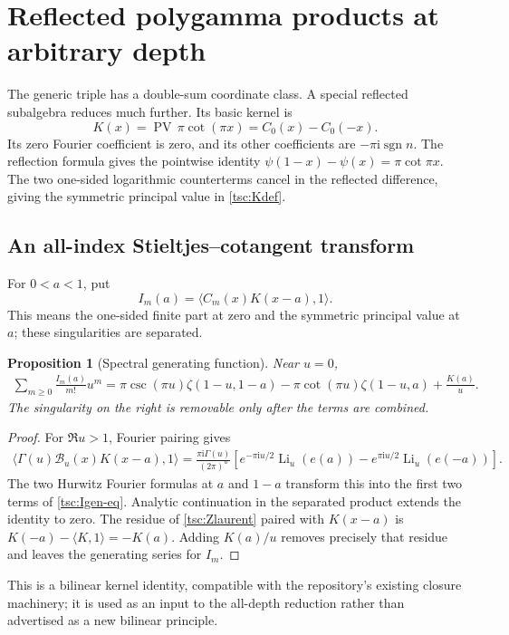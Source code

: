 \documentclass[11pt]{article}
\numberwithin{equation}{section}
\newtheorem{proposition}[theorem]{Proposition}
\theoremstyle{definition}\newtheorem{definition}[theorem]{Definition}
\theoremstyle{remark}\newtheorem{remark}[theorem]{Remark}
\DeclareMathOperator{\Li}{Li}
\DeclareMathOperator{\PV}{PV}
\DeclareMathOperator{\sgn}{sgn}
\newcommand{\ii}{\mathrm i}
\newcommand{\calB}{\mathcal B}
\begin{document}

\section{Reflected polygamma products at arbitrary depth}\label{tsc:reflected}
The generic triple has a double-sum coordinate class. A special reflected
subalgebra reduces much further. Its basic kernel is
\begin{equation}\label{tsc:Kdef}
 K(x)=\PV\,\pi\cot(\pi x)=C_0(x)-C_0(-x).
\end{equation}
Its zero Fourier coefficient is zero, and its other coefficients are
$-\pi\ii\sgn n$. The reflection formula gives the pointwise identity
$\psi(1-x)-\psi(x)=\pi\cot\pi x$. The two one-sided logarithmic
counterterms cancel in the reflected difference, giving the symmetric
principal value in \eqref{tsc:Kdef}.

\subsection{An all-index Stieltjes--cotangent transform}
For $0<a<1$, put
\begin{equation}\label{tsc:Idef}
 I_m(a)=\langle C_m(x)K(x-a),1\rangle.
\end{equation}
This means the one-sided finite part at zero and the symmetric principal
value at $a$; these singularities are separated.

\begin{proposition}[Spectral generating function]\label{tsc:Igen}
Near $u=0$,
\begin{align}\label{tsc:Igen-eq}
 \sum_{m\ge0}\frac{I_m(a)}{m!}u^m
  =\pi\csc(\pi u)\zeta(1-u,1-a)
     -\pi\cot(\pi u)\zeta(1-u,a)+\frac{K(a)}u.
\end{align}
The singularity on the right is removable only after the terms are combined.
\end{proposition}
\begin{proof}
For $\Re u>1$, Fourier pairing gives
\begin{align*}
 \langle\Gamma(u)\calB_u(x)K(x-a),1\rangle
 =\frac{\pi\ii\Gamma(u)}{(2\pi)^u}
   \left[e^{-\pi\ii u/2}\Li_u(e(a))
               -e^{\pi\ii u/2}\Li_u(e(-a))\right].
\end{align*}
The two Hurwitz Fourier formulas at $a$ and $1-a$ transform this into
the first two terms of \eqref{tsc:Igen-eq}. Analytic continuation in the
separated product extends the identity to zero. The residue of
\eqref{tsc:Zlaurent} paired with $K(x-a)$ is
$K(-a)-\langle K,1\rangle=-K(a)$. Adding $K(a)/u$ removes precisely that
residue and leaves the generating series for $I_m$.
\end{proof}
This is a bilinear kernel identity, compatible with the repository's
existing closure machinery; it is used as an input to the all-depth
reduction rather than advertised as a new bilinear principle.
\end{document}
